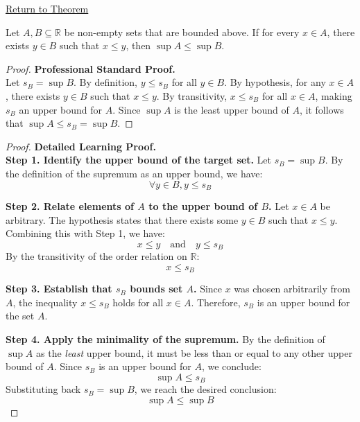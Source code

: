 \newpage
{}
\label{prf:order-comparison-of-suprema}

\begin{remark*}[Return]
\hyperref[prop:order-comparison-of-suprema]{Return to Theorem}
\end{remark*}

\begin{theorem*}
Let $A, B \subseteq \mathbb{R}$ be non-empty sets that are bounded above. If for every $x \in A$, there exists $y \in B$ such that $x \le y$, then $\sup A \le \sup B$.
\end{theorem*}

\begin{proof}
\textbf{Professional Standard Proof.}~\\
Let $s_B = \sup B$. By definition, $y \le s_B$ for all $y \in B$. By hypothesis, for any $x \in A$, there exists $y \in B$ such that $x \le y$. By transitivity, $x \le s_B$ for all $x \in A$, making $s_B$ an upper bound for $A$. Since $\sup A$ is the least upper bound of $A$, it follows that $\sup A \le s_B = \sup B$.
\end{proof}

\begin{proof}
\textbf{Detailed Learning Proof.}~\\

\textbf{Step 1. Identify the upper bound of the target set.}
Let $s_B = \sup B$. By the definition of the supremum as an upper bound, we have:
\[ \forall y \in B, y \le s_B \]

\textbf{Step 2. Relate elements of $A$ to the upper bound of $B$.}
Let $x \in A$ be arbitrary. The hypothesis states that there exists some $y \in B$ such that $x \le y$. Combining this with Step 1, we have:
\[ x \le y \quad \text{and} \quad y \le s_B \]
By the transitivity of the order relation on $\mathbb{R}$:
\[ x \le s_B \]

\textbf{Step 3. Establish that $s_B$ bounds set $A$.}
Since $x$ was chosen arbitrarily from $A$, the inequality $x \le s_B$ holds for all $x \in A$. Therefore, $s_B$ is an upper bound for the set $A$.

\textbf{Step 4. Apply the minimality of the supremum.}
By the definition of $\sup A$ as the \textit{least} upper bound, it must be less than or equal to any other upper bound of $A$. Since $s_B$ is an upper bound for $A$, we conclude:
\[ \sup A \le s_B \]
Substituting back $s_B = \sup B$, we reach the desired conclusion:
\[ \sup A \le \sup B \]
\end{proof}

